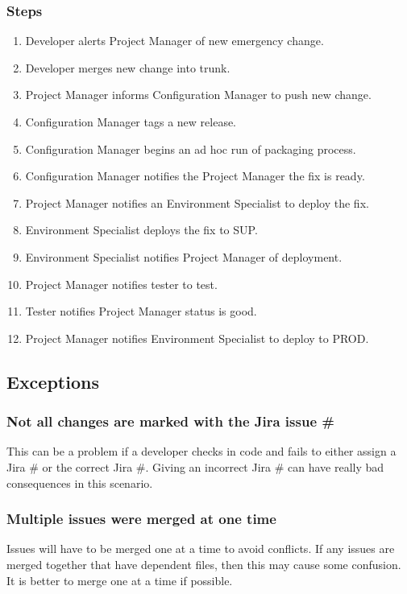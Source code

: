 \documentclass[12pt,notitlepage]{article}
\begin{document}
\subsubsection{Steps}
\begin{enumerate}
\item Developer alerts Project Manager of new emergency change.
\item Developer merges new change into trunk.
\item Project Manager informs Configuration Manager to push new change.
\item Configuration Manager tags a new release.
\item Configuration Manager begins an ad hoc run of packaging process.
\item Configuration Manager notifies the Project Manager the fix is ready.
\item Project Manager notifies an Environment Specialist to deploy the fix.
\item Environment Specialist deploys the fix to SUP.
\item Environment Specialist notifies Project Manager of deployment.
\item Project Manager notifies tester to test.
\item Tester notifies Project Manager status is good.
\item Project Manager notifies Environment Specialist to deploy to PROD.
\end{enumerate}

\subsection{Exceptions}
\subsubsection{Not all changes are marked with the Jira issue \#}
This can be a problem if a developer checks in code and fails to either assign
a Jira \# or the correct Jira \#. Giving an incorrect Jira \# can have really
bad consequences in this scenario.

\subsubsection{Multiple issues were merged at one time}
Issues will have to be merged one at a time to avoid conflicts. If any issues are merged
together that have dependent files, then this may cause some confusion. It is better
to merge one at a time if possible.
\end{document}
